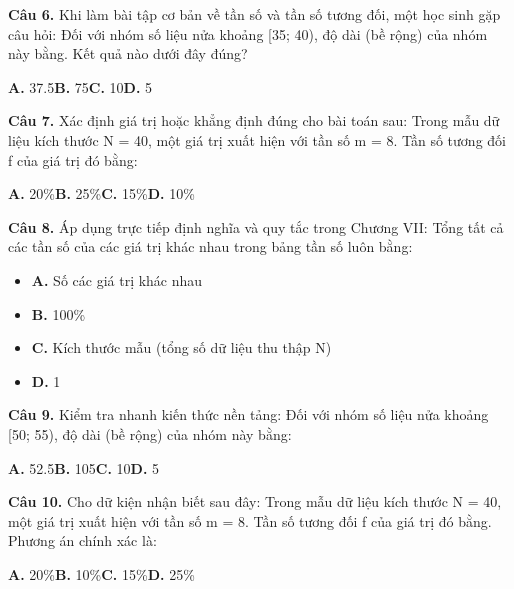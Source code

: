 \documentclass[11pt,a4paper]{article}
\begin{document}
\textbf{\color{primary} Câu 6.} Khi làm bài tập cơ bản về tần số và tần số tương đối, một học sinh gặp câu hỏi: Đối với nhóm số liệu nửa khoảng [35; 40), độ dài (bề rộng) của nhóm này bằng. Kết quả nào dưới đây đúng?\par
\hspace*{1.5em}\textbf{A.} 37.5\quad\quad \textbf{B.} 75\quad\quad \textbf{C.} 10\quad\quad \textbf{D.} 5\par\vspace{2pt}
\textbf{\color{primary} Câu 7.} Xác định giá trị hoặc khẳng định đúng cho bài toán sau: Trong mẫu dữ liệu kích thước N = 40, một giá trị xuất hiện với tần số m = 8. Tần số tương đối f của giá trị đó bằng:\par
\hspace*{1.5em}\textbf{A.} 20\%\quad\quad \textbf{B.} 25\%\quad\quad \textbf{C.} 15\%\quad\quad \textbf{D.} 10\%\par\vspace{2pt}
\textbf{\color{primary} Câu 8.} Áp dụng trực tiếp định nghĩa và quy tắc trong Chương VII: Tổng tất cả các tần số của các giá trị khác nhau trong bảng tần số luôn bằng:\par
\begin{itemize}\setlength{\itemsep}{1pt}\setlength{\parskip}{0pt}
  \item[] \textbf{A.} Số các giá trị khác nhau
  \item[] \textbf{B.} 100\%
  \item[] \textbf{C.} Kích thước mẫu (tổng số dữ liệu thu thập N)
  \item[] \textbf{D.} 1
\end{itemize}\vspace{2pt}
\textbf{\color{primary} Câu 9.} Kiểm tra nhanh kiến thức nền tảng: Đối với nhóm số liệu nửa khoảng [50; 55), độ dài (bề rộng) của nhóm này bằng:\par
\hspace*{1.5em}\textbf{A.} 52.5\quad\quad \textbf{B.} 105\quad\quad \textbf{C.} 10\quad\quad \textbf{D.} 5\par\vspace{2pt}
\textbf{\color{primary} Câu 10.} Cho dữ kiện nhận biết sau đây: Trong mẫu dữ liệu kích thước N = 40, một giá trị xuất hiện với tần số m = 8. Tần số tương đối f của giá trị đó bằng. Phương án chính xác là:\par
\hspace*{1.5em}\textbf{A.} 20\%\quad\quad \textbf{B.} 10\%\quad\quad \textbf{C.} 15\%\quad\quad \textbf{D.} 25\%\par\vspace{2pt}
\end{document}
